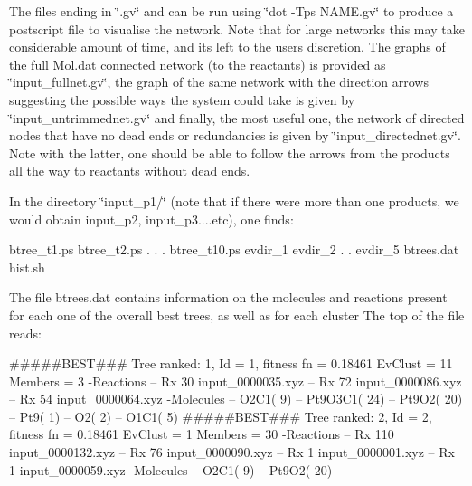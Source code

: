 The files ending in \char`\"{}.\+gv\char`\"{} and can be run using \char`\"{}dot -\/\+Tps N\+A\+M\+E.\+gv\char`\"{} to produce a postscript file to visualise the network. Note that for large networks this may take considerable amount of time, and its left to the users discretion. The graphs of the full Mol.\+dat connected network (to the reactants) is provided as \char`\"{}input\+\_\+fullnet.\+gv\char`\"{}, the graph of the same network with the direction arrows suggesting the possible ways the system could take is given by \char`\"{}input\+\_\+untrimmednet.\+gv\char`\"{} and finally, the most useful one, the network of directed nodes that have no dead ends or redundancies is given by \char`\"{}input\+\_\+directednet.\+gv\char`\"{}. Note with the latter, one should be able to follow the arrows from the products all the way to reactants without dead ends.

In the directory \char`\"{}input\+\_\+p1/\char`\"{} (note that if there were more than one products, we would obtain input\+\_\+p2, input\+\_\+p3....etc), one finds\+: \begin{DoxyVerb}btree_t1.ps
btree_t2.ps
   .
   .
   .
btree_t10.ps
evdir_1
evdir_2
   .
   .
evdir_5
btrees.dat
    hist.sh        
\end{DoxyVerb}


The file btrees.\+dat contains information on the molecules and reactions present for each one of the overall best trees, as well as for each cluster The top of the file reads\+: \begin{DoxyVerb}#####BEST### Tree ranked:     1, Id =     1, fitness fn =     0.18461 EvClust =    11 Members =     3
            -Reactions
            -- Rx    30 input_0000035.xyz
            -- Rx    72 input_0000086.xyz
            -- Rx    54 input_0000064.xyz
            -Molecules
            -- O2C1(    9)
            -- Pt9O3C1(   24)
            -- Pt9O2(   20)
            -- Pt9(    1)
            -- O2(    2)
            -- O1C1(    5)
#####BEST### Tree ranked:     2, Id =     2, fitness fn =     0.18461 EvClust =     1 Members =    30
            -Reactions
            -- Rx   110 input_0000132.xyz
            -- Rx    76 input_0000090.xyz
            -- Rx     1 input_0000001.xyz
            -- Rx     1 input_0000059.xyz
            -Molecules
            -- O2C1(    9)
            -- Pt9O2(   20)
\end{DoxyVerb}


